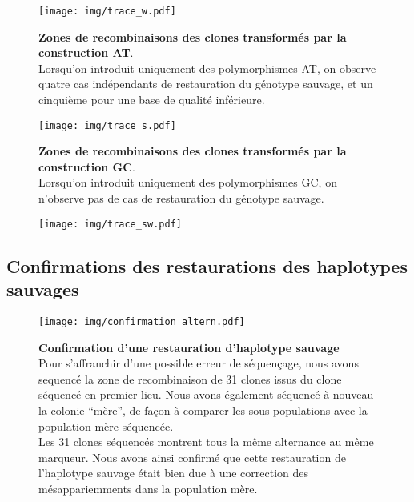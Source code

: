 \begin{figure}[p]%
  \begin{leftfullpage}
    \texttt{[image: img/trace\_w.pdf]}
    \caption[Zones de recombinaison des clones transformés par la construction
    AT]{\label{fig:tracew}\textbf{Zones de recombinaisons des clones transformés
        par la construction AT}. \\
      \rmfamily Lorsqu'on introduit uniquement des
      polymorphismes AT, on observe quatre cas indépendants de restauration du
      génotype sauvage, et un cinquième pour une base de qualité inférieure. }
  \end{leftfullpage}
\end{figure}
\begin{figure}[p]%
  \begin{fullpage}
    \texttt{[image: img/trace\_s.pdf]}
    \caption[Zones de recombinaisons des clones transformés par la construction
    GC]{\label{fig:traces} \textbf{Zones de recombinaisons des clones
        transformés par la construction GC}. \\
      \rmfamily Lorsqu'on introduit uniquement des polymorphismes GC, on n'observe pas de
      cas de restauration du génotype sauvage. }
  \end{fullpage}
\end{figure}
\begin{figure}[p]%
  \begin{leftfullpage}
    \texttt{[image: img/trace\_sw.pdf]}
    \caption[Zones de recombinaisons des clones transformés par la construction
    AT/GC]{\label{fig:tracesw} }
  \end{leftfullpage}
\end{figure}

\subsection{Confirmations des restaurations des haplotypes sauvages}
\label{subsec:confirm-haplotype}


\begin{figure}[ht]
  \centering
  \texttt{[image: img/confirmation\_altern.pdf]}
  \caption[Confirmation des restaurations]{\label{fig:confirm-haplotype}
    \textbf{Confirmation d'une restauration d'haplotype sauvage} \\
    \rmfamily Pour s'affranchir d'une possible erreur de séquençage, nous avons
    sequencé la zone de recombinaison de 31 clones issus du clone séquencé en
    premier lieu. Nous avons également séquencé à nouveau la colonie ``mère'',
    de façon à comparer les sous-populations avec la population mère séquencée.
    \\
    Les 31 clones séquencés montrent tous la même alternance au même marqueur.
    Nous avons ainsi confirmé que cette restauration de l'haplotype sauvage
    était bien due à une correction des mésappariemments dans la population
    mère.
  }
\end{figure}


